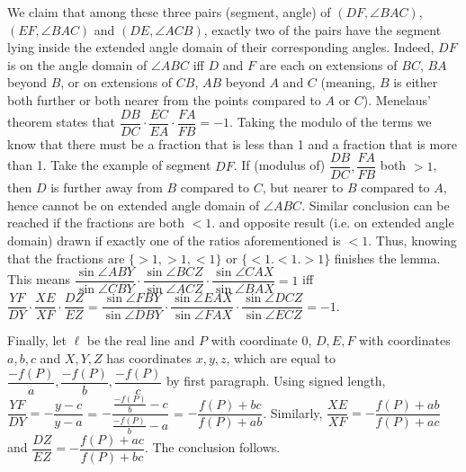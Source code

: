 \documentclass[11pt,a4paper]{article}
\begin{document}
We claim that among these three pairs (segment, angle) of $(DF, \angle BAC)$, $(EF,\angle BAC)$ and $(DE, \angle ACB)$, exactly two of the pairs have the segment lying inside the extended angle domain of their corresponding angles. Indeed, $DF$ is on the angle domain of $\angle ABC$ iff $D$ and $F$ are each on extensions of $BC$, $BA$ beyond $B$, or on extensions of $CB$, $AB$ beyond $A$ and $C$ (meaning, $B$ is either both further or both nearer from the points compared to $A$ or $C$). Menelaus' theorem states that $\dfrac{DB}{DC}\cdot\dfrac{EC}{EA}\cdot\dfrac{FA}{FB}=-1$. Taking the modulo of the terms we know that there must be a fraction that is less than 1 and a fraction that is more than 1. Take the example of segment $DF$. If (modulus of) $\dfrac{DB}{DC}, \dfrac{FA}{FB}$ both $>1$, then $D$ is further away from $B$ compared to $C$, but nearer to $B$ compared to $A$, hence cannot be on extended angle domain of $\angle ABC$. Similar conclusion can be reached if the fractions are both $<1$. and opposite result (i.e. on extended angle domain) drawn if exactly one of the ratios aforementioned is $<1$. Thus, knowing that the fractions are $\{>1,>1,<1\}$ or $\{<1.<1.>1\}$ finishes the lemma. This means  $\dfrac{\sin\angle ABY}{\sin\angle CBY}\cdot\dfrac{\sin\angle BCZ}{\sin\angle ACZ}\cdot\dfrac{\sin\angle CAX}{\sin\angle BAX}=1$ iff $\dfrac{YF}{DY}\cdot\dfrac{XE}{XF}\cdot\dfrac{DZ}{EZ}=\dfrac{\sin\angle FBY}{\sin\angle DBY}\cdot\dfrac{\sin\angle EAX}{\sin\angle FAX}\cdot \dfrac{\sin\angle DCZ}{\sin\angle ECZ}=-1.$

Finally, let $\ell$ be the real line and $P$ with coordinate 0, $D,E,F$ with coordinates $a,b,c$ and $X,Y,Z$ has coordinates $x,y,z$, which are equal to $\dfrac{-f(P)}{a},\dfrac{-f(P)}{b},\dfrac{-f(P)}{c}$ by first paragraph. Using signed length, $\dfrac{YF}{DY}=-\dfrac{y-c}{y-a}$ = $-\dfrac{\frac{-f(P)}{b}-c}{\frac{-f(P)}{b}-a}$ = $-\dfrac{f(P)+bc}{f(P)+ab}$. Similarly, $\dfrac{XE}{XF}=-\dfrac{f(P)+ab}{f(P)+ac}$ and $\dfrac{DZ}{EZ}=-\dfrac{f(P)+ac}{f(P)+bc}$. The conclusion follows.
\end{document}
